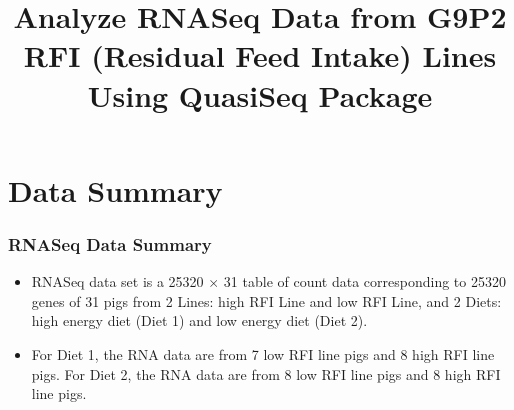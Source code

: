 \documentclass[handout,xcolor=pdftex,dvipsnames,table]{beamer}\usepackage[]{graphicx}\usepackage[]{color}
\title[RNASeq Analysis]{Analyze RNASeq Data from G9P2 RFI (Residual Feed Intake) Lines Using QuasiSeq Package}
\begin{document}
\frame{\maketitle}


\section{Data Summary}
\begin{frame}[fragile]
\frametitle{RNASeq Data Summary}
\begin{itemize}
\setlength{\itemsep}{.25in}
\item RNASeq data set is a  25320 $\times$ 31 table of count data  corresponding to 25320 genes of 31  pigs from 2 Lines: high RFI Line and low RFI Line, and 2 Diets: high energy diet (Diet 1) and low energy diet (Diet 2).

\item  For Diet 1, the RNA data are from 7 low RFI line pigs and 8  high RFI line pigs. 
For Diet 2, the RNA data are from 8 low RFI line pigs and 8  high RFI line pigs.
 
\end{itemize}
 

\end{frame}
\end{document}
